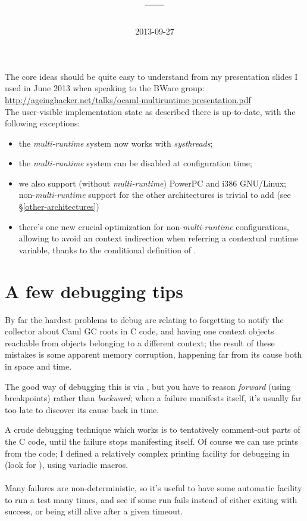 \documentclass[a4paper,twoside,12pt]{article}
\author{\AUTHOR \EMAIL{positron@gnu.org}}
\title{\TITLE\ ---\ \SUBTITLE}
\date{2013-09-27}
\renewcommand{\SECTION}[1]{§\ref{#1}}
\newcommand{\MULTIRUNTIME}[0]{\textit{multi-runtime}\xspace}
\begin{document}
\maketitle

The core ideas should be quite easy to understand from my presentation
slides I used in June 2013 when speaking to the BWare group:
\\
{\small
  \url{http://ageinghacker.net/talks/ocaml-multiruntime-presentation.pdf}}
\\
The user-visible implementation state as described there is
up-to-date, with the following exceptions:
\begin{itemize}
\item
  the \MULTIRUNTIME system now works with \textit{systhreads};
\item
  the \MULTIRUNTIME system can be disabled at configuration time;
\item
  we also support (without \MULTIRUNTIME) PowerPC and i386 GNU/Linux;
  non-\MULTIRUNTIME support for the other architectures is trivial to add (see \SECTION{other-architectures})
\item
  there's one new crucial optimization for non-\MULTIRUNTIME
  configurations, allowing to avoid an context indirection when
  referring a contextual runtime variable, thanks to the conditional
  definition of .
\end{itemize}


\section{A few debugging tips}
By far the hardest problems to debug are relating to forgetting to
notify the collector about Caml GC roots in C code, and having one
context objects reachable from objects belonging to a different
context; the result of these mistakes is some apparent memory
corruption, happening far from its cause both in space and time.

The good way of debugging this is via , but you have to
reason \textit{forward} (using breakpoints) rather than
\textit{backward}; when a failure manifests itself, it's usually far
too late to discover its cause back in time.

A crude debugging technique which works is to tentatively comment-out
parts of the C code, until the failure stops manifesting itself.  Of
course we can use prints from the code; I defined a relatively complex
printing facility for debugging in  (look for
), using variadic macros.
\\
\\
Many failures are non-deterministic, so it's useful to have some
automatic facility to run a test many times, and see if some run fails
instead of either exiting with success, or being still alive after a
given timeout.
\end{document}
